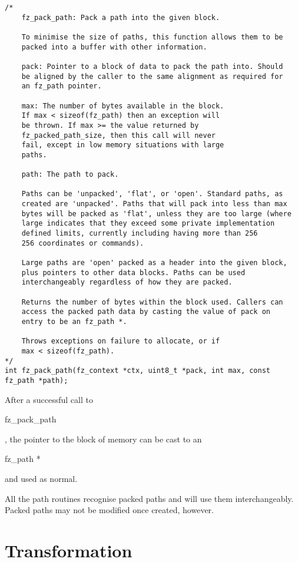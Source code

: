 \documentclass[oneside]{book}
\begin{document}
\begin{lstlisting}
/*
	fz_pack_path: Pack a path into the given block.

	To minimise the size of paths, this function allows them to be
	packed into a buffer with other information.

	pack: Pointer to a block of data to pack the path into. Should
	be aligned by the caller to the same alignment as required for
	an fz_path pointer.

	max: The number of bytes available in the block.
	If max < sizeof(fz_path) then an exception will
	be thrown. If max >= the value returned by
	fz_packed_path_size, then this call will never
	fail, except in low memory situations with large
	paths.

	path: The path to pack.

	Paths can be 'unpacked', 'flat', or 'open'. Standard paths, as
	created are 'unpacked'. Paths that will pack into less than max
	bytes will be packed as 'flat', unless they are too large (where
	large indicates that they exceed some private implementation
	defined limits, currently including having more than 256
	256 coordinates or commands).
	
	Large paths are 'open' packed as a header into the given block,
	plus pointers to other data blocks. Paths can be used
	interchangeably regardless of how they are packed.

	Returns the number of bytes within the block used. Callers can
	access the packed path data by casting the value of pack on
	entry to be an fz_path *.

	Throws exceptions on failure to allocate, or if
	max < sizeof(fz_path).
*/
int fz_pack_path(fz_context *ctx, uint8_t *pack, int max, const fz_path *path);
\end{lstlisting}

After a successful call to \begin{tt}fz\_pack\_path\end{tt}, the pointer to the block of memory can be cast to an \begin{tt}fz\_path *\end{tt} and used as normal.

All the path routines recognise packed paths and will use them interchangeably. Packed paths may not be modified once created, however.

\section{Transformation}
\end{document}
